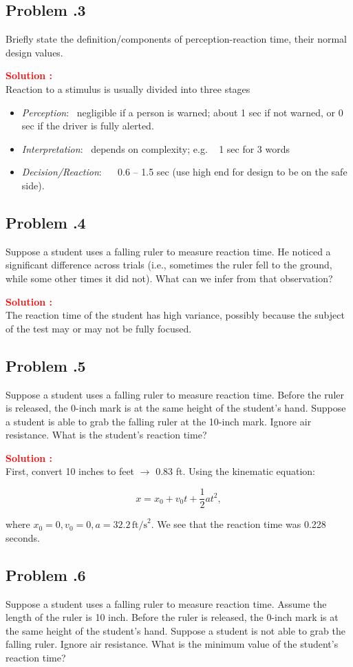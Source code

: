 \documentclass[12pt]{article}
\newcommand{\customsubsection}[1]{
  \subsection*{Problem \thesection.#1}
}
\begin{document}
\customsubsection{3}
Briefly state the definition/components of perception-reaction time, their normal design values.


\textbf{\textcolor{red}{Solution :}} \\
Reaction to a stimulus is usually divided into three stages 
\begin{itemize}
    \item \textit{Perception}: \, negligible if a person is warned; about 1 sec if not warned, or 0 sec if the driver is fully alerted. 
    \item  \textit{Interpretation}: \,  depends on complexity; e.g. ~ 1 sec for 3 words 
    \item  \textit{Decision/Reaction}: \, ~ 0.6 – 1.5 sec (use high end for design to be on the safe side).
\end{itemize}

\newpage


\customsubsection{4}
Suppose a student uses a falling ruler to measure reaction time. He noticed a significant difference across trials (i.e., sometimes the ruler fell to the ground, while some other times it did not). What can we infer from that observation? 


\textbf{\textcolor{red}{Solution :}} \\
The reaction time of the student has high variance, possibly because the subject of the test may or may not be fully focused.

\newpage


\customsubsection{5}
Suppose a student uses a falling ruler to measure reaction time. Before the ruler is released, the 0-inch mark is at the same height of the student’s hand. Suppose a student is able to grab the falling ruler at the 10-inch mark. Ignore air resistance. What is the student’s reaction time?

\textbf{\textcolor{red}{Solution :}} \\
First, convert 10 inches to feet $\rightarrow$ 0.83 ft. Using the kinematic equation:

\[
x = x_0 + v_0 t + \frac{1}{2}at^2,
\]

where \(x_0=0, v_0=0, a = 32.2 \, \text{ft/s}^2\). We see that the reaction time was 0.228 seconds.


\newpage

\customsubsection{6}
Suppose a student uses a falling ruler to measure reaction time. Assume the length of the ruler is 10 inch. Before the ruler is released, the 0-inch mark is at the same height of the student’s hand. Suppose a student is not able to grab the falling ruler. Ignore air resistance. What is the minimum value of the student’s reaction time? 
\end{document}

